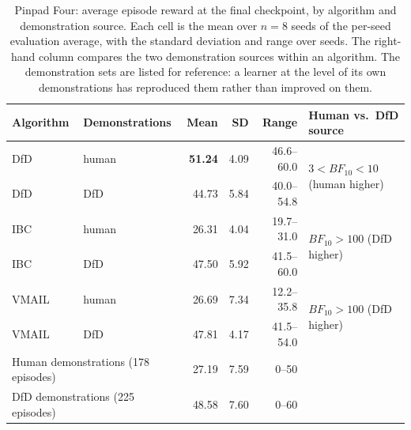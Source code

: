 \begin{table}[t]
\centering
\caption{Pinpad Four: average episode reward at the final checkpoint, by algorithm and demonstration
source. Each cell is the mean over $n=8$ seeds of the per-seed evaluation average, with the standard
deviation and range over seeds. The right-hand column compares the two demonstration sources within an
algorithm. The demonstration sets are listed for reference: a learner at the level of its own
demonstrations has reproduced them rather than improved on them.}
\label{tab:results_pinpad}
\begin{tabular}{llrrrl}
\toprule
Algorithm & Demonstrations & Mean & SD & Range & Human vs.\ DfD source \\
\midrule
DfD   & human & \textbf{51.24} & 4.09 & 46.6--60.0 & \multirow{2}{*}{$3 < BF_{10} < 10$ (human higher)} \\
DfD   & DfD   & 44.73 & 5.84 & 40.0--54.8 & \\
\addlinespace[2pt]
IBC   & human & 26.31 & 4.04 & 19.7--31.0 & \multirow{2}{*}{$BF_{10} > 100$ (DfD higher)} \\
IBC   & DfD   & 47.50 & 5.92 & 41.5--60.0 & \\
\addlinespace[2pt]
VMAIL & human & 26.69 & 7.34 & 12.2--35.8 & \multirow{2}{*}{$BF_{10} > 100$ (DfD higher)} \\
VMAIL & DfD   & 47.81 & 4.17 & 41.5--54.0 & \\
\midrule
\multicolumn{2}{l}{Human demonstrations (178 episodes)} & 27.19 & 7.59 & 0--50 & \\
\multicolumn{2}{l}{DfD demonstrations (225 episodes)}   & 48.58 & 7.60 & 0--60 & \\
\bottomrule
\end{tabular}
\end{table}

